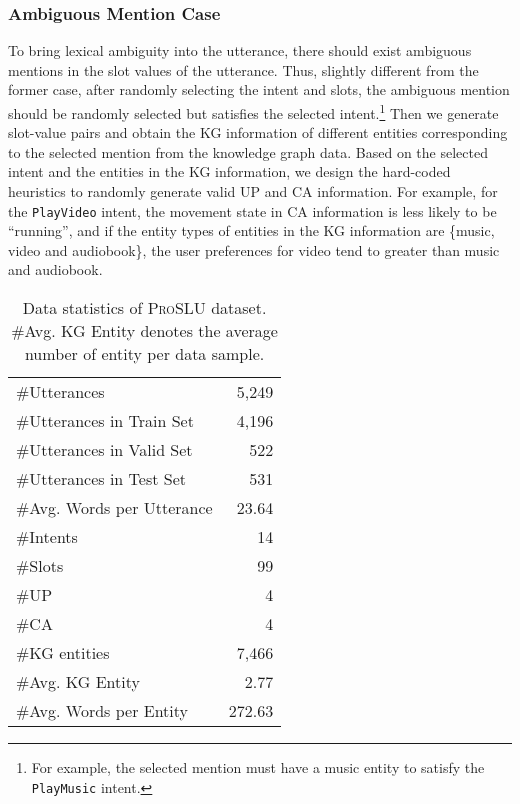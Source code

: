 \documentclass[letterpaper]{article} \usepackage{aaai22}  \usepackage{times}  \usepackage{helvet}  \usepackage{courier}  \usepackage[hyphens]{url}  \usepackage{graphicx} \urlstyle{rm} \def\UrlFont{\rm}  \usepackage{natbib}  \usepackage{caption} \DeclareCaptionStyle{ruled}{labelfont=normalfont,labelsep=colon,strut=off} \frenchspacing  \setlength{\pdfpagewidth}{8.5in}  \setlength{\pdfpageheight}{11in}  \usepackage{algorithm}
\begin{document}
\subsubsection{Ambiguous Mention Case}
To bring lexical ambiguity into the utterance, there should exist ambiguous mentions in the slot values of the utterance.
Thus, slightly different from the former case, after randomly selecting the intent and slots, 
the ambiguous mention should be randomly selected but satisfies the selected intent.\footnote{For example, the selected mention must have a music entity to satisfy the \texttt{PlayMusic} intent.}
Then we generate slot-value pairs and obtain the KG information of different entities corresponding to the selected mention from the knowledge graph data.
Based on the selected intent and the entities in the KG information, we design the hard-coded heuristics to randomly generate valid UP and CA information.
For example, for the \texttt{PlayVideo} intent, the movement state in CA information is less likely to be ``running'', and if the entity types of entities in the KG information are \{music, video and audiobook\},
the user preferences for video tend to greater than music and audiobook.

\begin{table}[t]
	\centering
	\begin{adjustbox}{width=0.3\textwidth}
		\begin{tabular}{l|r}
			\hline \hline
			\#Utterances & 5,249 \\
			\#Utterances in Train Set & 4,196 \\ 
			\#Utterances in Valid Set & 522 \\ 
			\#Utterances in Test Set & 531 \\ 
			\#Avg. Words per Utterance & 23.64 \\ 
			\#Intents & 14\\
			\#Slots & 99\\
			\#UP & 4\\
			\#CA & 4\\
			\#KG entities & 7,466\\
			\#Avg. KG Entity & 2.77 \\
			\#Avg. Words per Entity & 272.63\\ 
			\hline \hline
		\end{tabular}
	\end{adjustbox}
	\caption{
		Data statistics of \textsc{ProSLU} dataset. \#Avg. KG Entity denotes the average number of entity per data sample.
	}
	\label{tab:statistics}
\end{table}
\end{document}
